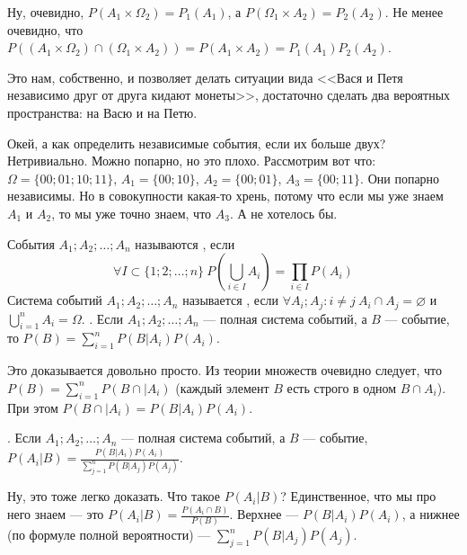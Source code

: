 \documentclass{article}
\begin{document}
\begin{itemize}
\begin{Proof}
            Ну, очевидно, $P(A_1\times\Omega_2)=P_1(A_1)$, а $P(\Omega_1\times A_2)=P_2(A_2)$. Не менее очевидно, что $P((A_1\times\Omega_2)\cap(\Omega_1\times A_2))=P(A_1\times A_2)=P_1(A_1)P_2(A_2)$.
        \end{Proof}
        \begin{Comment}
            Это нам, собственно, и позволяет делать ситуации вида <<Вася и Петя независимо друг от друга кидают монеты>>, достаточно сделать два вероятных пространства: на Васю и на Петю.
        \end{Comment}
        \begin{Comment}
            Окей, а как определить независимые события, если их больше двух? Нетривиально. Можно попарно, но это плохо. Рассмотрим вот что: $\Omega=\{00;01;10;11\}$, $A_1=\{00;10\}$, $A_2=\{00;01\}$, $A_3=\{00;11\}$. Они попарно независимы. Но в совокупности какая-то хрень, потому что если мы уже знаем $A_1$ и $A_2$, то мы уже точно знаем, что $A_3$. А не хотелось бы.
        \end{Comment}
        \dfn События $A_1;A_2;\ldots;A_n$ называются , если $$\forall I\subset\{1;2;\ldots;n\}~P\left(\bigcup\limits_{i\in I}A_i\right)=\prod\limits_{i\in I}P(A_i)$$
        \dfn Система событий $A_1;A_2;\ldots;A_n$ называется , если $\forall A_i;A_j\colon i\neq j~A_i\cap A_j=\varnothing$ и $\bigcup\limits_{i=1}^nA_i=\Omega$.
        \thm {}. Если $A_1;A_2;\ldots;A_n$ --- полная система событий, а $B$ --- событие, то $P(B)=\sum\limits_{i=1}^nP(B|A_i)P(A_i)$.
        \begin{Proof}
            Это доказывается довольно просто. Из теории множеств очевидно следует, что $P(B)=\sum\limits_{i=1}^nP(B\cap |A_i)$ (каждый элемент $B$ есть строго в одном $B\cap A_i$). При этом $P(B\cap |A_i)=P(B|A_i)P(A_i)$.
        \end{Proof}
        \thm {}. Если $A_1;A_2;\ldots;A_n$ --- полная система событий, а $B$ --- событие, $P(A_i|B)=\frac{P(B|A_i)P(A_i)}{\sum\limits_{j=1}^nP(B|A_j)P(A_j)}$.
        \begin{Proof}
            Ну, это тоже легко доказать. Что такое $P(A_i|B)$? Единственное, что мы про него знаем --- это $P(A_i|B)=\frac{P(A_i\cap B)}{P(B)}$. Верхнее --- $P(B|A_i)P(A_i)$, а нижнее (по формуле полной вероятности) --- $\sum\limits_{j=1}^nP(B|A_j)P(A_j)$.
        \end{Proof}
        \begin{Comment}

\end{Comment}
\end{itemize}
\end{document}
